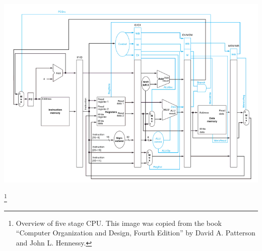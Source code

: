 \documentclass{article}
\begin{document}
\thispagestyle{empty}

\begin{center}
\includegraphics[angle=-90,scale=0.7]{5stage}
\end{center}

\footnote{Overview of five stage CPU.  This image was copied
	from the book ``Computer Organization and Design, Fourth Edition''
	by David A. Patterson and John L. Hennessy.}
\end{document}
